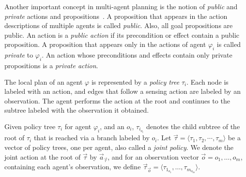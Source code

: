 \documentclass[letterpaper]{article} %
\theoremstyle{definition}
\begin{document}

Another important concept in multi-agent planning is the notion of {\em public} and {\em private} actions and propositions~\citep{brafman2008one}.
A proposition that appears in the action descriptions of multiple agents is called {\em public}. Also, all goal propositions are public.
An action is a {\em public action} if its precondition or effect contain a public proposition.
A proposition that appears only in the actions of agent $\varphi_i$ is called {\em private} to  $\varphi_i$. An action whose preconditions and effects contain only private propositions is a {\em private action}.




The local plan of an agent $\varphi$ is represented by a \emph{policy tree} $\tau_i$.  Each node is labeled with an action, and edges that follow a sensing action are labeled by an observation.  The agent performs the action at the root and continues to the subtree labeled with the observation it obtained.

Given policy tree $\tau_i$ for agent $\varphi_i$, and an $o_i$, $\tau_{i_{o_i}}$ denotes the child subtree of the root of $\tau_i$ that is reached via a branch labeled by $o_i$.
Let $\vec{\tau} = \langle  \tau_1, \tau_2, \cdots, \tau_m \rangle$ be a vector of policy trees, one per agent,
also called a {\em joint policy}.
We denote the joint action at the root of $\vec{\tau}$ by $\vec{a}_{\vec{\tau}}$, and for an observation vector
$\vec{o}=o_1,\ldots, o_m$, containing each agent's observation, we define $\vec{\tau}_{\vec{o}}= \langle  \tau_{1_{o_1}},\ldots, \tau_{m_{o_m}}\rangle$.
\end{document}
